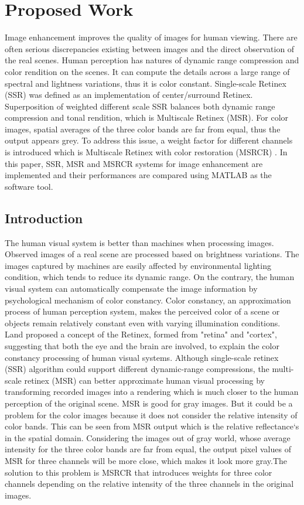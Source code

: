 \chapter{Proposed Work}
Image enhancement improves the quality of images for human viewing. There are often serious discrepancies existing between images and the direct observation of the real scenes. Human perception has natures of dynamic range compression and color rendition on the scenes\cite{retinex}. It can compute the details across a large range of spectral and lightness variations, thus it is color constant. Single-scale Retinex (SSR) was defined as an implementation of center/surround Retinex\cite{retinex}. Superposition of weighted different scale SSR balances both dynamic range compression and tonal rendition, which is Multiscale Retinex (MSR)\cite{msr}. For color images, spatial averages of the three color bands are far from equal, thus the output appears grey. To address this issue, a weight factor for different channels is introduced which is Multiscale Retinex with color restoration (MSRCR) \cite{msrcr}. In this paper, SSR, MSR and MSRCR systems for image enhancement are implemented and their performances are compared using MATLAB as the software tool.

\section{Introduction}
The human visual system is better than machines when processing images. Observed images of a real scene are processed based on brightness variations. The images captured by machines are easily affected by environmental lighting condition, which tends to reduce its dynamic range. On the contrary, the human visual system can automatically compensate the image information by psychological mechanism of color constancy. Color constancy, an approximation process of human perception system, makes the perceived color of a scene or objects remain relatively constant even with varying illumination conditions\cite{ill2}. Land proposed a concept of the Retinex, formed from "retina" and "cortex", suggesting that both the eye and the brain are involved, to explain the color constancy processing of human visual systems\cite{retinex}. Although single-scale retinex (SSR) algorithm\cite{ssr} could support different dynamic-range compressions, the multi-scale retinex (MSR) can better approximate human visual processing by transforming recorded images into a rendering which is much closer to the human perception of the original scene. MSR is good for gray images\cite{msr}. But it could be a problem for the color images because it does not consider the relative intensity of color bands. This can be seen from MSR output which is the relative reflectance‘s in the spatial domain\cite{ie2}. Considering the images out of gray world, whose average intensity for the three color bands are far from equal, the output pixel values of MSR for three channels will be more close, which makes it look more gray.The solution to this problem is MSRCR that introduces weights for three color channels depending on the relative intensity of the three channels in the original images\cite{retinex}.



